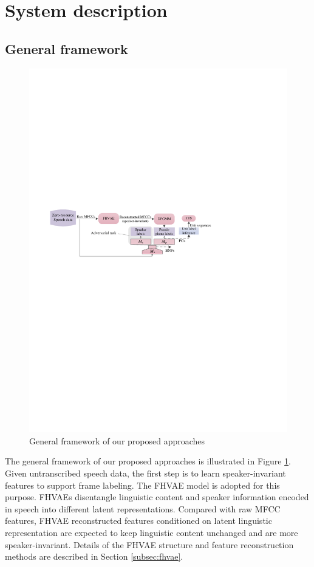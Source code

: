 \documentclass[a4paper]{article}
\begin{document}
\section{System description}
\subsection{General framework}
\begin{figure}[t]
    \centering
    \includegraphics[width=1 \linewidth]{LaTeX/general_framework.pdf}
    \caption{General framework of our proposed approaches}
    \label{fig:framework}
\end{figure}
The general framework of our proposed approaches is illustrated in Figure \ref{fig:framework}. Given untranscribed speech data, the first step is to learn speaker-invariant features   to support frame labeling. The FHVAE model \cite{hsu2017nips} is adopted for this purpose. FHVAEs disentangle linguistic content and speaker information encoded in speech into different latent representations. 
Compared with raw MFCC features, FHVAE reconstructed features conditioned on latent linguistic representation are expected to keep linguistic content unchanged and are more speaker-invariant. 
Details of the FHVAE structure and feature reconstruction methods are described in Section \ref{subsec:fhvae}.
\end{document}
